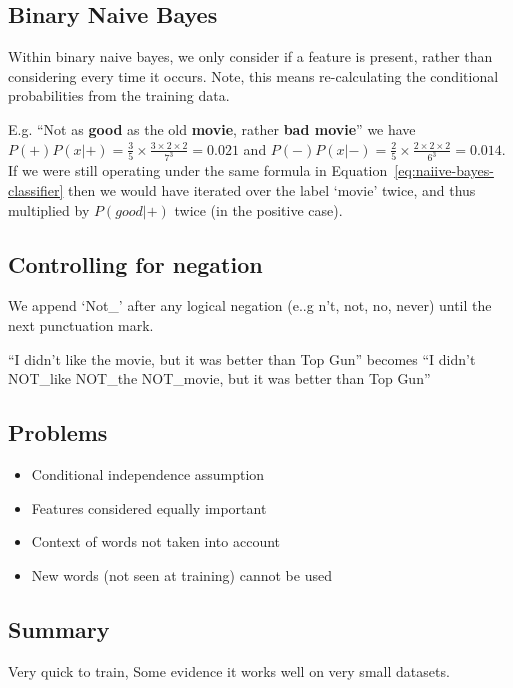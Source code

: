 \documentclass[11pt]{article}
\begin{document}
\subsection{Binary Naive Bayes}

Within binary naive bayes, we only consider if a feature is present, rather than considering every time it occurs. Note, this means re-calculating the conditional probabilities from the training data.

E.g. ``Not as \textbf{good} as the old \textbf{movie}, rather \textbf{bad movie}'' we have $P(+)P(x|+) = \frac 3 5 \times \frac{3\times 2 \times 2}{7^3} = 0.021$ and $P(-)P(x|-) = \frac 2 5 \times \frac{2 \times 2 \times 2}{6^3} = 0.014$. If we were still operating under the same formula in Equation~\ref{eq:naiive-bayes-classifier} then we would have iterated over the label `movie' twice, and thus multiplied by $P(good|+)$ twice (in the positive case).

\subsection{Controlling for negation}

We append `Not\_' after any logical negation (e..g n't, not, no, never) until the next punctuation mark.

``I didn't like the movie, but it was better than Top Gun'' becomes ``I didn't NOT\_like NOT\_the NOT\_movie, but it was better than Top Gun''

\subsection{Problems}

\begin{itemize}
    \item Conditional independence assumption
    \item Features considered equally important
    \item Context of words not taken into account
    \item New words (not seen at training) cannot be used
\end{itemize}

\subsection{Summary}

Very quick to train, Some evidence it works well on very small datasets.
\end{document}
